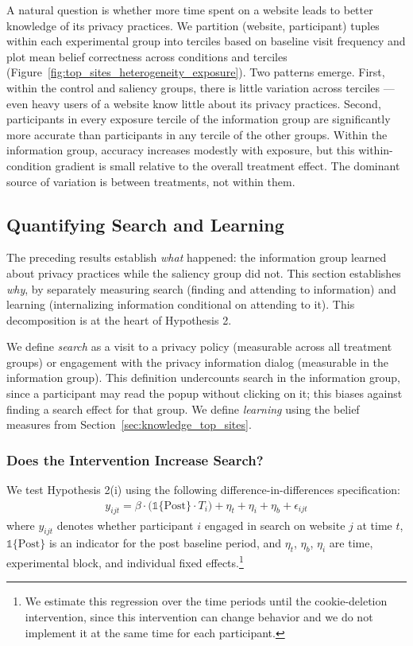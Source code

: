 \documentclass[12pt]{article}
\theoremstyle{definition}
\theoremstyle{remark}
\begin{document}
A natural question is whether more time spent on a website leads to better knowledge of its privacy practices. We partition (website, participant) tuples within each experimental group into terciles based on baseline visit frequency and plot mean belief correctness across conditions and terciles (Figure~\ref{fig:top_sites_heterogeneity_exposure}). Two patterns emerge. First, within the control and saliency groups, there is little variation across terciles --- even heavy users of a website know little about its privacy practices. Second, participants in every exposure tercile of the information group are significantly more accurate than participants in any tercile of the other groups. Within the information group, accuracy increases modestly with exposure, but this within-condition gradient is small relative to the overall treatment effect. The dominant source of variation is between treatments, not within them.

\subsection{Quantifying Search and Learning}\label{sec:search_learning}

The preceding results establish \emph{what} happened: the information group learned about privacy practices while the saliency group did not. This section establishes \emph{why}, by separately measuring search (finding and attending to information) and learning (internalizing information conditional on attending to it). This decomposition is at the heart of Hypothesis 2.

We define \emph{search} as a visit to a privacy policy (measurable across all treatment groups) or engagement with the privacy information dialog (measurable in the information group). This definition undercounts search in the information group, since a participant may read the popup without clicking on it; this biases against finding a search effect for that group. We define \emph{learning} using the belief measures from Section~\ref{sec:knowledge_top_sites}.

\subsubsection*{Does the Intervention Increase Search?}

We test Hypothesis 2(i) using the following difference-in-differences specification:
\begin{align}\label{eq:did_search}
        y_{ijt} = \beta \cdot \Big (\mathbb{1}\lbrace\text{Post}\rbrace \cdot T_i \Big )+ \eta_t + \eta_i + \eta_{b} + \epsilon_{ijt}
\end{align}
where $y_{ijt}$ denotes whether participant $i$ engaged in search on website $j$ at time $t$, $\mathbb{1}\lbrace\text{Post}\rbrace$ is an indicator for the post baseline period, and $\eta_t$, $\eta_b$, $\eta_i$ are time, experimental block, and individual fixed effects.\footnote{We estimate this regression over the time periods until the cookie-deletion intervention, since this intervention can change behavior and we do not implement it at the same time for each participant.}
\end{document}
